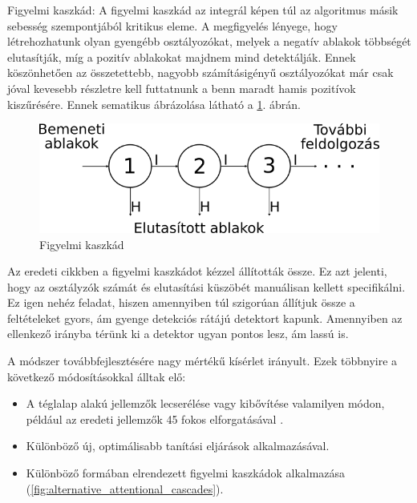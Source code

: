 Figyelmi kaszkád:
A figyelmi kaszkád az integrál képen túl az algoritmus másik sebesség szempontjából kritikus eleme. A megfigyelés lényege, hogy létrehozhatunk olyan gyengébb osztályozókat, melyek a negatív ablakok többségét elutasítják, míg a pozitív ablakokat majdnem mind detektálják. Ennek köszönhetően az összetettebb, nagyobb számításigényű osztályozókat már csak jóval kevesebb részletre kell futtatnunk a benn maradt hamis pozitívok kiszűrésére. Ennek sematikus ábrázolása látható a \ref{fig:attentional_cascade}. ábrán.

\begin{figure}
    \centering
    \includegraphics[width=\linewidth]{figures/attentional_cascade.png}
    \caption{Figyelmi kaszkád}
    \label{fig:attentional_cascade}
\end{figure}

Az eredeti cikkben \cite{viola_robust_2004} a figyelmi kaszkádot kézzel állították össze. Ez azt jelenti, hogy az osztályzók számát és elutasítási küszöbét manuálisan kellett specifikálni. Ez igen nehéz feladat, hiszen amennyiben túl szigorúan állítjuk össze a feltételeket gyors, ám gyenge detekciós rátájú detektort kapunk. Amennyiben az ellenkező irányba térünk ki a detektor ugyan pontos lesz, ám lassú is.

A módszer továbbfejlesztésére nagy mértékű kísérlet irányult. Ezek többnyire a következő módosításokkal álltak elő:

\begin{itemize}
    \item A téglalap alakú jellemzők lecserélése vagy kibővítése valamilyen módon, például az eredeti jellemzők 45 fokos elforgatásával \cite{lienhart_extended_2002}.
    \item Különböző új, optimálisabb tanítási eljárások alkalmazásával.
    \item Különböző formában elrendezett figyelmi kaszkádok alkalmazása (\ref{fig:alternative_attentional_cascades}).
\end{itemize}

